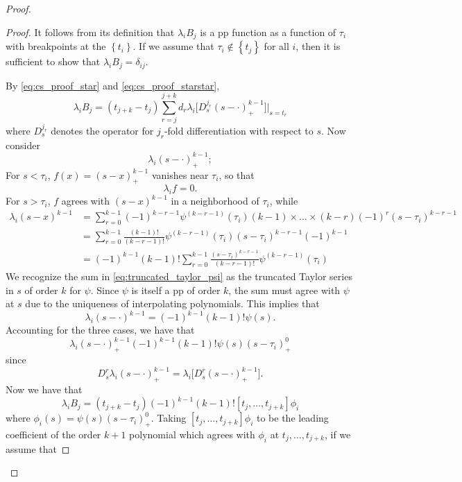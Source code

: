 \documentclass[12pt]{article}
\theoremstyle{definition}
\begin{document}
\begin{proof}
\begin{proof}
It follows from its definition that $\lambda_i B_j$ is a pp function as a function of $\tau_i$ with breakpoints at the $\left\{t_i\right\}$. If we assume that $\tau_i \not \in \left\{t_j\right\}$ for all $i$, then it is sufficient to show that $\lambda_i B_j = \delta_{ij}$.

By \ref{eq:cs_proof_star} and \ref{eq:cs_proof_starstar}, 
\[
\lambda_i B_j = \left(t_{j+k}-t_j\right)\sum_{r=j}^{j+k} d_r \lambda_i \bigg[D_s^{j_r}\left(s-\cdot\right)_+^{k-1} \bigg]\vert_{s=t_r}
\]
where $D_s^{j_r}$ denotes the operator for $j_r$-fold differentiation with respect to $s$. Now consider
\[
\lambda_i\left(s-\cdot\right)_+^{k-1};
\]
For $s<\tau_i$, $f\left(x\right) = \left(s-x\right)_+^{k-1}$ vanishes near $\tau_i$, so that 
\[
\lambda_i f = 0.
\]
For $s>\tau_i$, $f$ agrees with $\left(s-x\right)^{k-1}$ in a neighborhood of $\tau_i$, while 
\begin{align}
\lambda_i \left(s-x\right)^{k-1} &= \sum_{r=0}^{k-1}  \left(-1\right)^{k-r-1} \psi^{\left(k-r-1\right)}\left(\tau_i\right)\left(k-1\right)\times \dots \times \left(k-r\right) \left(-1\right)^{r} \left(s-\tau_i\right)^{k-r-1} \nonumber \\
&= \sum_{r=0}^{k-1}  \frac{\left(k-1\right)!}{\left(k-r-1\right)!} \psi^{\left(k-r-1\right)}\left(\tau_i\right)\left(s-\tau_i\right)^{k-r-1}\left(-1\right)^{k-1} \nonumber \\
&= \left(-1\right)^{k-1}\left(k-1\right)! \sum_{r=0}^{k-1}  \frac{\left(s-\tau_i\right)^{k-r-1}}{\left(k-r-1\right)!} \psi^{\left(k-r-1\right)}\left(\tau_i\right) \label{eq:truncated_taylor_psi}
\end{align}
We recognize the sum in \ref{eq:truncated_taylor_psi} as the truncated Taylor series in $s$ of order $k$ for $\psi$. Since $\psi$ is itself a pp of order $k$, the sum must agree with $\psi$ at $s$ due to the uniqueness of interpolating polynomials. This implies that 
\[
\lambda_i\left(s-\cdot\right)^{k-1} = \left(-1\right)^{k-1} \left(k-1\right)! \psi\left(s\right).
\]
Accounting for the three cases, we have that 
\[
\lambda_i \left(s-\cdot\right)_+^{k-1} \left(-1\right)^{k-1} \left(k-1\right)! \psi\left(s\right) \left(s-\tau_i\right)_+^0 
\]
since 
\[
D_s^r\lambda_i \left(s-\cdot\right)_+^{k-1} = \lambda_i \bigg[D_s^r \left(s-\cdot\right)_+^{k-1} \bigg].
\]
Now we have that 
\[
\lambda_i B_j = \left(t_{j+k}-t_j\right)  \left(-1\right)^{k-1}  \left(k-1\right)! \left[t_j,\dots,t_{j+k}\right]\phi_i 
\]
where $\phi_i\left(s\right) = \psi\left(s\right)\left(s-\tau_i\right)_+^{0}$. Taking $\left[t_j,\dots,t_{j+k}\right]\phi_i $ to be the leading coefficient of the order $k+1$ polynomial which agrees with $\phi_i$ at $t_j,\dots,t_{j+k}$, if we assume that 

\end{proof}
\end{proof}
\end{document}
